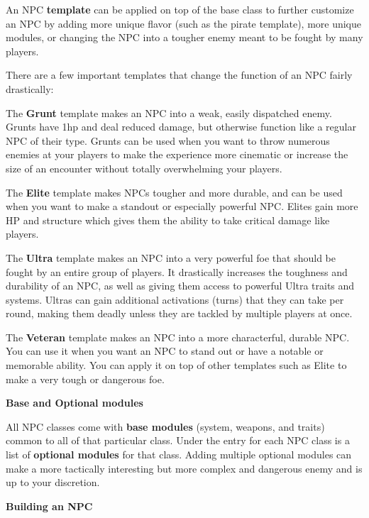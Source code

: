 An NPC \textbf{template} can be applied on top of the base class to further customize an NPC by
adding more unique flavor (such as the pirate template), more unique modules, or changing the
NPC into a tougher enemy meant to be fought by many players.

There are a few important templates that change the function of an NPC fairly drastically:

The \textbf{Grunt} template makes an NPC into a weak, easily dispatched enemy. Grunts have 1hp and
deal reduced damage, but otherwise function like a regular NPC of their type. Grunts can be
used when you want to throw numerous enemies at your players to make the experience more
cinematic or increase the size of an encounter without totally overwhelming your players.

The \textbf{Elite} template makes NPCs tougher and more durable, and can be used when you want to
make a standout or especially powerful NPC. Elites gain more HP and structure which gives
them the ability to take critical damage like players.

The \textbf{Ultra} template makes an NPC into a very powerful foe that should be fought by an entire
group of players. It drastically increases the toughness and durability of an NPC, as well as
giving them access to powerful Ultra traits and systems. Ultras can gain additional activations
(turns) that they can take per round, making them deadly unless they are tackled by multiple
players at once.

The \textbf{Veteran} template makes an NPC into a more characterful, durable NPC. You can use it
when you want an NPC to stand out or have a notable or memorable ability. You can apply it on
top of other templates such as Elite to make a very tough or dangerous foe.
                         
\begin{center}
    \textbf{Base and Optional modules}
\end{center}

All NPC classes come with \textbf{base modules} (system, weapons, and traits) common to all of that
particular class. Under the entry for each NPC class is a list of \textbf{optional modules} for that class.
Adding multiple optional modules can make a more tactically interesting but more complex and
dangerous enemy and is up to your discretion.
                     
\begin{center}
    \textbf{Building an NPC}
\end{center}

